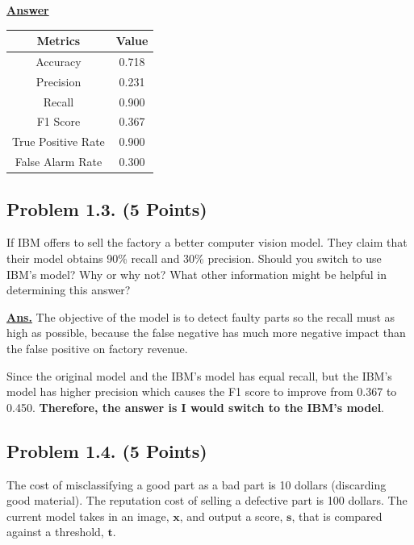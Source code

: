 \documentclass[12pt, a4paper]{article}
\begin{document}
            \noindent \underline{\textbf{Answer}}
            \begin{table}[h]
                \centering
                \begin{tabular}{|c|c|}
                    \hline
                    \textbf{Metrics} & \textbf{Value} \\
                    \hline \hline
                    Accuracy & 0.718 \\
                    Precision & 0.231 \\
                    Recall & 0.900 \\
                    F1 Score & 0.367 \\
                    True Positive Rate & 0.900 \\
                    False Alarm Rate & 0.300 \\
                    \hline
                \end{tabular}
            \end{table}

        \subsection{Problem 1.3. (5 Points)}
            If IBM offers to sell the factory a better computer vision model. They claim that their model obtains 90\% recall and 30\% precision.
            Should you switch to use IBM's model? Why or why not?
            What other information might be helpful in determining this answer?

            \vspace{1em}

            \noindent \underline{\textbf{Ans.}} The objective of the model is to detect faulty parts so the recall must as high as possible,
            because the false negative has much more negative impact than the false positive on factory revenue.

            Since the original model and the IBM's model has equal recall, but the IBM's model has higher precision which causes the F1 score
            to improve from 0.367 to 0.450. \textbf{Therefore, the answer is I would switch to the IBM's model}.

    \pagebreak

        \subsection{Problem 1.4. (5 Points)}
            The cost of misclassifying a good part as a bad part is 10 dollars (discarding good material).
            The reputation cost of selling a defective part is 100 dollars.
            The current model takes in an image, $\mathbf{x}$, and output a score, $\mathbf{s}$, that is compared against a threshold, $\mathbf{t}$.
\end{document}

